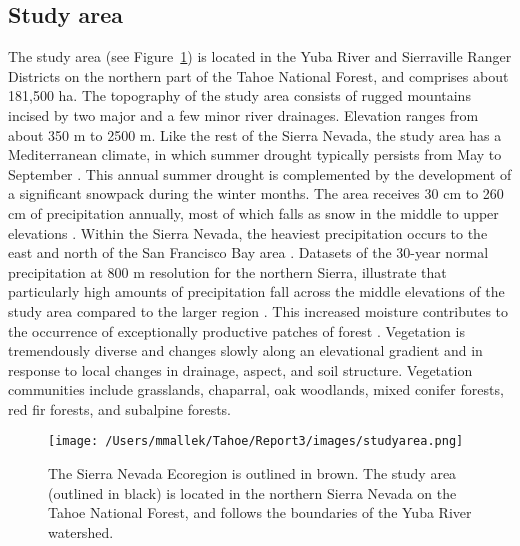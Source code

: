 \subsection*{Study area}
The study area (see Figure~\ref{projectarea-ch3}) is located in the Yuba River and Sierraville Ranger Districts on the northern part of the Tahoe National Forest, and comprises about 181,500 ha. The topography of the study area consists of rugged mountains incised by two major and a few minor river drainages. Elevation ranges from about 350 m to 2500 m. Like the rest of the Sierra Nevada, the study area has a Mediterranean climate, in which summer drought typically persists from May to September \citep{Minnich2007,Skinner1996}. This annual summer drought is complemented by the development of a significant snowpack during the winter months. The area receives 30 cm to 260 cm of precipitation annually, most of which falls as snow in the middle to upper elevations \citep{Storer1963}. Within the Sierra Nevada, the heaviest precipitation occurs to the east and north of the San Francisco Bay area \citep{VanWag2006}. Datasets of the 30-year normal precipitation at 800 m resolution for the northern Sierra, illustrate that particularly high amounts of precipitation fall across the middle elevations of the study area compared to the larger region \citep{PRISMClimateGroup2004}. This increased moisture contributes to the occurrence of exceptionally productive patches of forest \citep{Littell2012}. Vegetation is tremendously diverse and changes slowly along an elevational gradient and in response to local changes in drainage, aspect, and soil structure. Vegetation communities include grasslands, chaparral, oak woodlands, mixed conifer forests, red fir forests, and subalpine forests.

\begin{figure}
\centering
\texttt{[image: /Users/mmallek/Tahoe/Report3/images/studyarea.png]}
\caption{The Sierra Nevada Ecoregion is outlined in brown. The study area (outlined in black) is located in the northern Sierra Nevada on the Tahoe National Forest, and follows the boundaries of the Yuba River watershed.}
\label{projectarea-ch3}
\end{figure}

